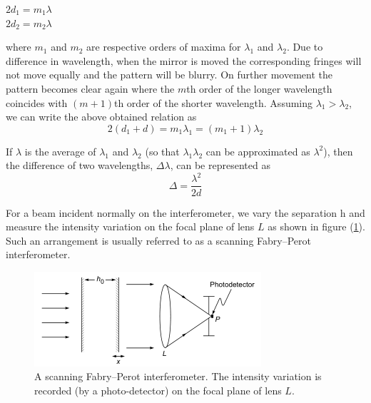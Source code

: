 \documentclass{article}
\begin{document}
\begin{center}
    $2 d_1 = m_1 \lambda$\\
    $2 d_2 = m_2 \lambda$
\end{center}
\noindent
where $m_1$ and $m_2$ are respective orders of maxima for $\lambda_1$ and $\lambda_2$. Due to difference in wavelength, when the mirror is moved the corresponding fringes will not move equally and 
the pattern will be blurry. On further movement the pattern becomes clear again where the $m$th order of the longer wavelength coincides with $(m + 1)$th order of the shorter wavelength. 
Assuming $\lambda_1 > \lambda_2$, we can write the above obtained relation as
\begin{equation}
    2 (d_1 + d) = m_1 \lambda_1 = (m_1 + 1) \lambda_2
\end{equation}
\par
\noindent
If $\lambda$ is the average of $\lambda_1$ and $\lambda_2$ (so that $\lambda_1 \lambda_2$ can be approximated as $\lambda^2$), then the difference of two wavelengths, $\Delta \lambda$, can be represented as
\begin{equation}
\label{eq13}
    \boxed{\Delta = \dfrac{\lambda^2}{2 d}}
\end{equation}
\par
\noindent
For a beam incident normally on the interferometer, we vary the separation h and measure the intensity variation on the focal plane of lens $L$ as shown in figure (\ref{fig:scanning}). Such an arrangement is usually referred to as a scanning Fabry–Perot interferometer.
\begin{figure}[h!]
    \centering
    \captionsetup{justification=centering}
    \includegraphics{Figures/scanning.png}
    \caption{A scanning Fabry–Perot interferometer. The intensity variation is recorded (by a photo-detector) on the focal plane of lens $L$.}
    \label{fig:scanning}
\end{figure}
\clearpage
\end{document}
